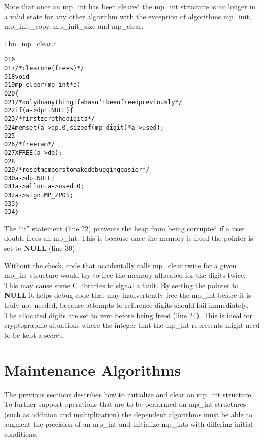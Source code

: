 \documentclass[b5paper]{book}
\begin{document}
Note that once an mp\_int has been cleared the mp\_int structure is no longer in a valid state for any other algorithm
with the exception of algorithms mp\_init, mp\_init\_copy, mp\_init\_size and mp\_clear.

\vspace{+3mm}\begin{small}
\hspace{-5.1mm}{\bf File}: bn\_mp\_clear.c
\vspace{-3mm}
\begin{alltt}
016   
017   /* clear one (frees)  */
018   void
019   mp_clear (mp_int * a)
020   \{
021     /* only do anything if a hasn't been freed previously */
022     if (a->dp != NULL) \{
023       /* first zero the digits */
024       memset (a->dp, 0, sizeof (mp_digit) * a->used);
025   
026       /* free ram */
027       XFREE(a->dp);
028   
029       /* reset members to make debugging easier */
030       a->dp    = NULL;
031       a->alloc = a->used = 0;
032       a->sign  = MP_ZPOS;
033     \}
034   \}
\end{alltt}
\end{small}

The ``if'' statement (line 22) prevents the heap from being corrupted if a user double-frees an 
mp\_int.  This is because once the memory is freed the pointer is set to \textbf{NULL} (line 30).  

Without the check, code that accidentally calls mp\_clear twice for a given mp\_int structure would try to free the memory 
allocated for the digits twice.  This may cause some C libraries to signal a fault.  By setting the pointer to 
\textbf{NULL} it helps debug code that may inadvertently free the mp\_int before it is truly not needed, because attempts 
to reference digits should fail immediately. The allocated digits are set to zero before being freed (line 24).  
This is ideal for cryptographic situations where the integer that the mp\_int represents might need to be kept a secret.

\section{Maintenance Algorithms}

The previous sections describes how to initialize and clear an mp\_int structure.  To further support operations
that are to be performed on mp\_int structures (such as addition and multiplication) the dependent algorithms must be
able to augment the precision of an mp\_int and 
initialize mp\_ints with differing initial conditions.  
\end{document}
